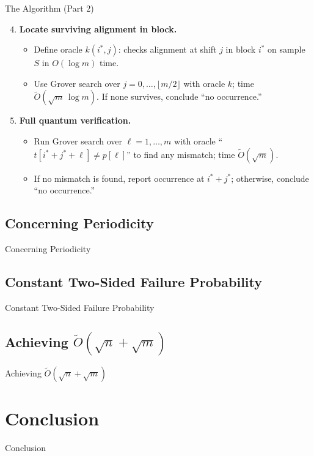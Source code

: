 \documentclass{beamer}
\begin{document}
\begin{frame}{The Algorithm (Part 2)}
    \begin{enumerate}
        \setcounter{enumi}{3}
        \item \textbf{Locate surviving alignment in block.}
              \begin{itemize}
                  \item Define oracle \(k(i^*,j)\): checks alignment at shift \(j\) in block \(i^*\) on sample \(S\) in \(O(\log m)\) time.
                  \item Use Grover search over \(j=0,\dots,\lfloor m/2\rfloor\) with oracle \(k\); time \(\widetilde O(\sqrt{m}\,\log m)\). If none survives, conclude “no occurrence.”
              \end{itemize}
        \item \textbf{Full quantum verification.}
              \begin{itemize}
                  \item Run Grover search over \(\ell=1,\dots,m\) with oracle “\(t[i^*+j^*+\ell]\neq p[\ell]\)” to find any mismatch; time \(\widetilde O(\sqrt{m})\).
                  \item If no mismatch is found, report occurrence at \(i^*+j^*\); otherwise, conclude “no occurrence.”
              \end{itemize}
    \end{enumerate}
\end{frame}

\subsection{Concerning Periodicity}
\begin{frame}{Concerning Periodicity}
\end{frame}

\subsection{Constant Two-Sided Failure Probability}
\begin{frame}{Constant Two-Sided Failure Probability}
\end{frame}

\subsection{Achieving \texorpdfstring{$\tilde{O}(\sqrt{n} + \sqrt{m})$}{O(sqrt(n)+sqrt(m))}}
\begin{frame}{Achieving \texorpdfstring{$\tilde{O}(\sqrt{n} + \sqrt{m})$}{O(sqrt(n)+sqrt(m))}}
\end{frame}


\section{Conclusion}
\begin{frame}{Conclusion}
\end{frame}
\end{document}
